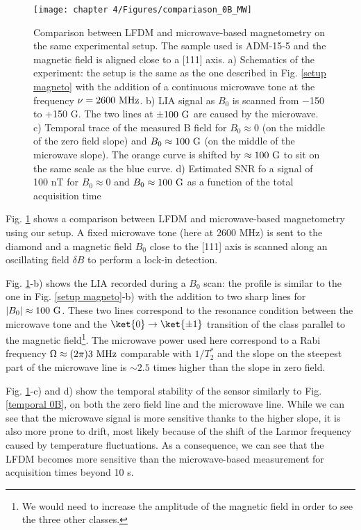 \documentclass[a4paper, 11pt]{report}
\begin{document}
\begin{figure}[h!]
\centering
\texttt{[image: chapter 4/Figures/compariason\_0B\_MW]}
\caption{Comparison between LFDM and microwave-based magnetometry on the same experimental setup. The sample used is ADM-15-5 and the magnetic field is aligned close to a [111] axis. a) Schematics of the experiment: the setup is the same as the one described in Fig. \ref{setup magneto} with the addition of a continuous microwave tone at the frequency $\nu=2600\ \rm MHz$. b) LIA signal as $B_0$ is scanned from $-$150 to +150 G. The two lines at $\pm 100\ \rm G$ are caused by the microwave. c) Temporal trace of the measured B field for $B_0 \approx 0$ (on the middle of the zero field slope) and $B_0 \approx 100\ \rm G$ (on the middle of the microwave slope). The orange curve is shifted by $\approx 100\ \rm G$ to sit on the same scale as the blue curve. d) Estimated SNR fo a signal of 100 nT for $B_0 \approx 0$ and $B_0 \approx 100\ \rm G$ as a function of the total acquisition time}
\label{comparaison 0B MW}
\end{figure}

Fig. \ref{comparaison 0B MW} shows a comparison between LFDM and microwave-based magnetometry using our setup. A fixed microwave tone (here at 2600 MHz) is sent to the diamond and a magnetic field $B_0$ close to the [111] axis is scanned along an oscillating field $\delta B$ to perform a lock-in detection. 

Fig. \ref{comparaison 0B MW}-b) shows the LIA recorded during a $B_0$ scan: the profile is similar to the one in Fig. \ref{setup magneto}-b) with the addition to two sharp lines for $|B_0| \approx 100\ \rm G$. These two lines correspond to the resonance condition between the microwave tone and the $\ket{0} \to \ket{\pm 1}$ transition of the class parallel to the magnetic field\footnote{We would need to increase the amplitude of the magnetic field in order to see the three other classes.}. The microwave power used here correspond to a Rabi frequency $\Omega \approx (2\pi) 3\ \rm MHz$ comparable with $1/T_2^*$ and the slope on the steepest part of the microwave line is $\sim 2.5$ times higher than the slope in zero field.

Fig. \ref{comparaison 0B MW}-c) and d) show the temporal stability of the sensor similarly to Fig. \ref{temporal 0B}, on both the zero field line and the microwave line. While we can see that the microwave signal is more sensitive thanks to the higher slope, it is also more prone to drift, most likely because of the shift of the Larmor frequency caused by temperature fluctuations. As a consequence, we can see that the LFDM becomes more sensitive than the microwave-based measurement for acquisition times beyond 10 s.
\end{document}
